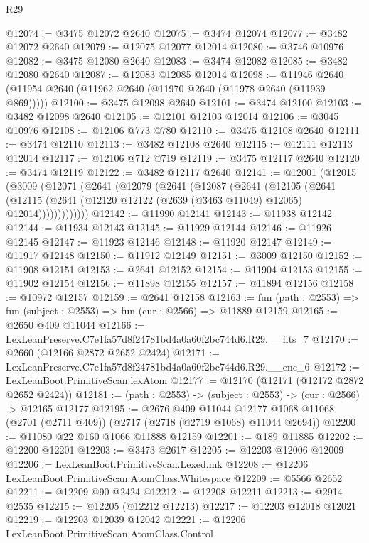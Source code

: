 \begin{lexlean}{R29}
\begin{coremodule}
@12074 := @3475 @12072 @2640
@12075 := @3474 @12074
@12077 := @3482 @12072 @2640
@12079 := @12075 @12077 @12014
@12080 := @3746 @10976
@12082 := @3475 @12080 @2640
@12083 := @3474 @12082
@12085 := @3482 @12080 @2640
@12087 := @12083 @12085 @12014
@12098 := @11946 @2640 (@11954 @2640 (@11962 @2640 (@11970 @2640 (@11978 @2640 (@11939 @869)))))
@12100 := @3475 @12098 @2640
@12101 := @3474 @12100
@12103 := @3482 @12098 @2640
@12105 := @12101 @12103 @12014
@12106 := @3045 @10976
@12108 := @12106 @773 @780
@12110 := @3475 @12108 @2640
@12111 := @3474 @12110
@12113 := @3482 @12108 @2640
@12115 := @12111 @12113 @12014
@12117 := @12106 @712 @719
@12119 := @3475 @12117 @2640
@12120 := @3474 @12119
@12122 := @3482 @12117 @2640
@12141 := @12001
    (@12015
      (@3009
        (@12071
          (@2641
            (@12079
              (@2641
                (@12087
                  (@2641
                    (@12105
                      (@2641
                        (@12115
                          (@2641 (@12120 @12122 (@2639 (@3463 @11049) @12065) @12014)))))))))))))
@12142 := @11990 @12141
@12143 := @11938 @12142
@12144 := @11934 @12143
@12145 := @11929 @12144
@12146 := @11926 @12145
@12147 := @11923 @12146
@12148 := @11920 @12147
@12149 := @11917 @12148
@12150 := @11912 @12149
@12151 := @3009 @12150
@12152 := @11908 @12151
@12153 := @2641 @12152
@12154 := @11904 @12153
@12155 := @11902 @12154
@12156 := @11898 @12155
@12157 := @11894 @12156
@12158 := @10972 @12157
@12159 := @2641 @12158
@12163 := fun (path : @2553) => fun (subject : @2553) => fun (cur : @2566) => @11889 @12159
@12165 := @2650 @409 @11044
@12166 := LexLeanPreserve.C7e1fa57d8f24781bd4a0a60f2bc744d6.R29.__fits_7
@12170 := @2660 (@12166 @2872 @2652 @2424)
@12171 := LexLeanPreserve.C7e1fa57d8f24781bd4a0a60f2bc744d6.R29.__enc_6
@12172 := LexLeanBoot.PrimitiveScan.lexAtom
@12177 := @12170 (@12171 (@12172 @2872 @2652 @2424))
@12181 := (path : @2553) -> (subject : @2553) -> (cur : @2566) -> @12165 @12177
@12195 := @2676
    @409
    @11044
    @12177
    @1068
    @11068
    (@2701 (@2711 @409))
    (@2717 (@2718 (@2719 @1068) @11044 @2694))
@12200 := @11080 @22 @160 @1066 @11888 @12159
@12201 := @189 @11885
@12202 := @12200 @12201
@12203 := @3473 @2617
@12205 := @12203 @12006 @12009
@12206 := LexLeanBoot.PrimitiveScan.Lexed.mk
@12208 := @12206 LexLeanBoot.PrimitiveScan.AtomClass.Whitespace
@12209 := @5566 @2652
@12211 := @12209 @90 @2424
@12212 := @12208 @12211
@12213 := @2914 @2535
@12215 := @12205 (@12212 @12213)
@12217 := @12203 @12018 @12021
@12219 := @12203 @12039 @12042
@12221 := @12206 LexLeanBoot.PrimitiveScan.AtomClass.Control

\end{coremodule}
\end{lexlean}
